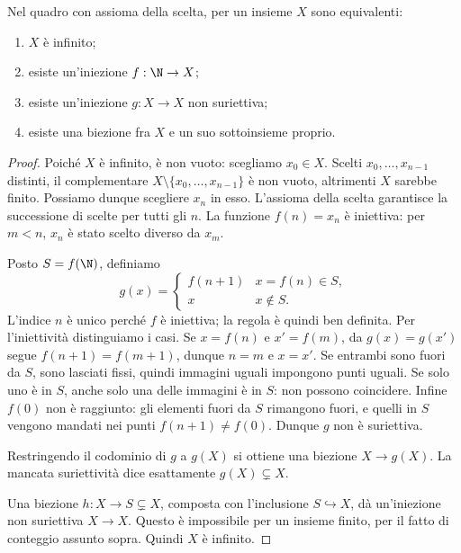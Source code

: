 \begin{teorema}\label{teo:infiniti}
Nel quadro con assioma della scelta, per un insieme $X$ sono equivalenti:
\begin{enumerate}[label=\alph*)]
\item $X$ è infinito;
\item esiste un'iniezione $f:\N\to X$;
\item esiste un'iniezione $g:X\to X$ non suriettiva;
\item esiste una biezione fra $X$ e un suo sottoinsieme proprio.
\end{enumerate}
\end{teorema}
\begin{proof}
 Poiché $X$ è infinito, è non vuoto: scegliamo $x_0\in X$. Scelti $x_0,\ldots,x_{n-1}$ distinti, il complementare $X\setminus\{x_0,\ldots,x_{n-1}\}$ è non vuoto, altrimenti $X$ sarebbe finito. Possiamo dunque scegliere $x_n$ in esso. L'assioma della scelta garantisce la successione di scelte per tutti gli $n$. La funzione $f(n)=x_n$ è iniettiva: per $m<n$, $x_n$ è stato scelto diverso da $x_m$.

 Posto $S=f(\N)$, definiamo
\[
g(x)=\begin{cases}f(n+1)&x=f(n)\in S,\\x&x\notin S.\end{cases}
\]
L'indice $n$ è unico perché $f$ è iniettiva; la regola è quindi ben definita. Per l'iniettività distinguiamo i casi. Se $x=f(n)$ e $x'=f(m)$, da $g(x)=g(x')$ segue $f(n+1)=f(m+1)$, dunque $n=m$ e $x=x'$. Se entrambi sono fuori da $S$, sono lasciati fissi, quindi immagini uguali impongono punti uguali. Se solo uno è in $S$, anche solo una delle immagini è in $S$: non possono coincidere. Infine $f(0)$ non è raggiunto: gli elementi fuori da $S$ rimangono fuori, e quelli in $S$ vengono mandati nei punti $f(n+1)\ne f(0)$. Dunque $g$ non è suriettiva.

 Restringendo il codominio di $g$ a $g(X)$ si ottiene una biezione $X\to g(X)$. La mancata suriettività dice esattamente $g(X)\subsetneq X$.

 Una biezione $h:X\to S\subsetneq X$, composta con l'inclusione $S\hookrightarrow X$, dà un'iniezione non suriettiva $X\to X$. Questo è impossibile per un insieme finito, per il fatto di conteggio assunto sopra. Quindi $X$ è infinito.
\end{proof}


